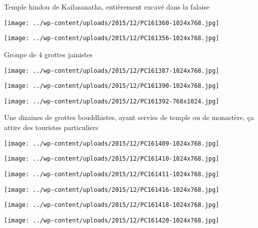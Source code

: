  Temple hindou de Kailasanatha, entièrement excavé dans la falaise \newline
 \newline
\centerline{\texttt{[image: ../wp-content/uploads/2015/12/PC161360-1024x768.jpg]} } 
 \newline
 \newline
\centerline{\texttt{[image: ../wp-content/uploads/2015/12/PC161356-1024x768.jpg]} } 
 \newline
 Groupe de 4 grottes jainistes \newline
 \newline
\centerline{\texttt{[image: ../wp-content/uploads/2015/12/PC161387-1024x768.jpg]} } 
 \newline
 \newline
\centerline{\texttt{[image: ../wp-content/uploads/2015/12/PC161390-1024x768.jpg]} } 
 \newline
 \newline
\centerline{\texttt{[image: ../wp-content/uploads/2015/12/PC161392-768x1024.jpg]} } 
 \newline
 Une dizaines de grottes bouddhistes, ayant servies de temple ou de monastère, ça attire des touristes particuliers \newline
 \newline
\centerline{\texttt{[image: ../wp-content/uploads/2015/12/PC161409-1024x768.jpg]} } 
 \newline
 \newline
\centerline{\texttt{[image: ../wp-content/uploads/2015/12/PC161410-1024x768.jpg]} } 
 \newline
 \newline
\centerline{\texttt{[image: ../wp-content/uploads/2015/12/PC161411-1024x768.jpg]} } 
 \newline
 \newline
\centerline{\texttt{[image: ../wp-content/uploads/2015/12/PC161416-1024x768.jpg]} } 
 \newline
 \newline
\centerline{\texttt{[image: ../wp-content/uploads/2015/12/PC161418-1024x768.jpg]} } 
 \newline
 \newline
\centerline{\texttt{[image: ../wp-content/uploads/2015/12/PC161420-1024x768.jpg]} } 
 \newline
 \newline
